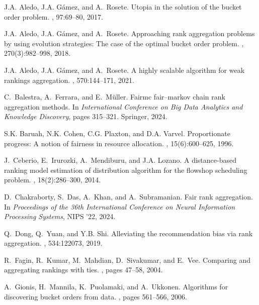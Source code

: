 \documentclass[preprint,12pt]{article}
\theoremstyle{definition}
\theoremstyle{remark}
\theoremstyle{example} %
\begin{document}
\begin{thebibliography}{10}

J.A. Aledo, J.A. Gámez, and A.~Rosete.
\newblock Utopia in the solution of the bucket order problem.
, 97:69–80, 2017.

J.A. Aledo, J.A. Gámez, and A.~Rosete.
\newblock Approaching rank aggregation problems by using evolution strategies: The case of the optimal bucket order problem.
, 270(3):982--998, 2018.

J.A. Aledo, J.A. Gámez, and A.~Rosete.
\newblock A highly scalable algorithm for weak rankings aggregation.
, 570:144--171, 2021.

C.~Balestra, A.~Ferrara, and E.~M{\"u}ller.
\newblock Fairmc fair--markov chain rank aggregation methods.
\newblock In {\em International Conference on Big Data Analytics and Knowledge Discovery}, pages 315--321. Springer, 2024.

S.K. Baruah, N.K. Cohen, C.G. Plaxton, and D.A. Varvel.
\newblock Proportionate progress: A notion of fairness in resource allocation.
, 15(6):600–625, 1996.

J.~Ceberio, E.~Irurozki, A.~Mendiburu, and J.A. Lozano.
\newblock A distance-based ranking model estimation of distribution algorithm for the flowshop scheduling problem.
, 18(2):286--300, 2014.

D.~Chakraborty, S.~Das, A.~Khan, and A.~Subramanian.
\newblock Fair rank aggregation.
\newblock In {\em Proceedings of the 36th International Conference on Neural Information Processing Systems}, NIPS '22, 2024.

Q.~Dong, Q.~Yuan, and Y.B. Shi.
\newblock Alleviating the recommendation bias via rank aggregation.
, 534:122073, 2019.

R.~Fagin, R.~Kumar, M.~Mahdian, D.~Sivakumar, and E.~Vee.
\newblock Comparing and aggregating rankings with ties.
, pages 47--58, 2004.

A.~Gionis, H.~Mannila, K.~Puolamaki, and A.~Ukkonen.
\newblock Algorithms for discovering bucket orders from data.
, pages 561--566, 2006.


\end{thebibliography}
\end{document}
